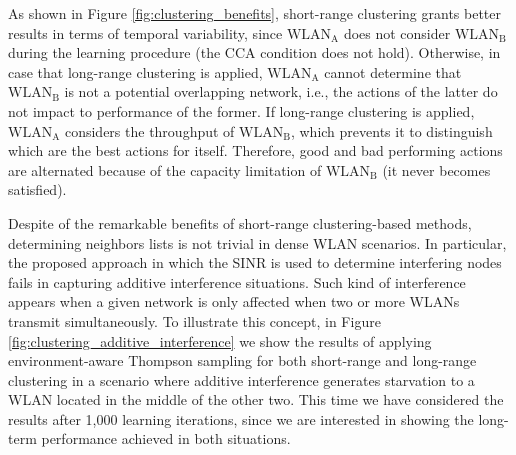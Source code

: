 \documentclass[preprint,12pt]{elsarticle}
\begin{document}
As shown in Figure \ref{fig:clustering_benefits}, short-range clustering grants better results in terms of temporal variability, since $\text{WLAN}_\text{A}$ does not consider $\text{WLAN}_\text{B}$ during the learning procedure (the CCA condition does not hold). Otherwise, in case that long-range clustering is applied, $\text{WLAN}_\text{A}$ cannot determine that $\text{WLAN}_\text{B}$ is not a potential overlapping network, i.e., the actions of the latter do not impact to performance of the former. If long-range clustering is applied, $\text{WLAN}_\text{A}$ considers the throughput of $\text{WLAN}_\text{B}$, which prevents it to distinguish which are the best actions for itself. Therefore, good and bad performing actions are alternated because of the capacity limitation of $\text{WLAN}_\text{B}$ (it never becomes satisfied).

Despite of the remarkable benefits of short-range clustering-based methods, determining neighbors lists is not trivial in dense WLAN scenarios. In particular, the proposed approach in which the SINR is used to determine interfering nodes fails in capturing additive interference situations. Such kind of interference appears when a given network is only affected when two or more WLANs transmit simultaneously. To illustrate this concept, in Figure \ref{fig:clustering_additive_interference} we show the results of applying environment-aware Thompson sampling for both short-range and long-range clustering in a scenario where additive interference generates starvation to a WLAN located in the middle of the other two. This time we have considered the results after 1,000 learning iterations, since we are interested in showing the long-term performance achieved in both situations.
\end{document}
